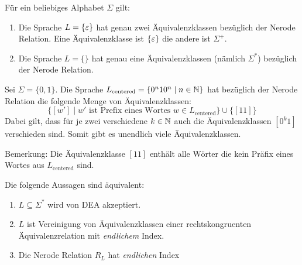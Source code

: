 \begin{Bsp}
      Für ein beliebiges Alphabet $\Sigma$ gilt:
      \begin{enumerate}
       \item Die Sprache $L=\{\varepsilon\}$ hat genau zwei Äquivalenzklassen bezüglich der Nerode Relation.
      Eine Äquivalenzklasse ist $\{\varepsilon\}$ die andere ist $\Sigma^+$.
       \item Die Sprache $L=\{\}$ hat genau eine Äquivalenzklassen (nämlich $\Sigma^*$) bezüglich der Nerode Relation.
      \end{enumerate}
\end{Bsp}

\begin{Bsp}
Sei $\Sigma=\{0,1\}$. Die Sprache $L_\text{centered}=\{0^n10^n \mid n\in\mathbb{N}\}$ hat bezüglich der Nerode Relation die folgende Menge von Äquivalenzklassen:
$$\{ [w'] \mid w' \text{ ist Prefix eines Wortes } w\in L_\text{centered}\} \cup \{ [11] \}$$
Dabei gilt, dass für je zwei verschiedene $k\in\mathbb{N}$
auch die Äquivalenzklassen $[0^k1]$ verschieden sind. Somit gibt es unendlich viele Äquivalenzklassen.

Bemerkung: Die Äquivalenzklasse $[11]$ enthält alle Wörter die kein Präfix eines Wortes aus $L_\text{centered}$ sind.
 
\end{Bsp}



\begin{Satz} %
        Die folgende Aussagen sind äquivalent:
        \begin{enumerate}
                \item\label{itm:Nerode1} $L\subseteq \Sigma^*$ wird von \ac{DEA} akzeptiert.
                \item\label{itm:Nerode2} $L$ ist Vereinigung von Äquivalenzklassen einer rechtskongruenten Äquivalenzrelation mit \emph{endlichem} Index.
                \item\label{itm:Nerode3} Die Nerode Relation $R_L$ hat \emph{endlichen} Index
        \end{enumerate}
\end{Satz}

